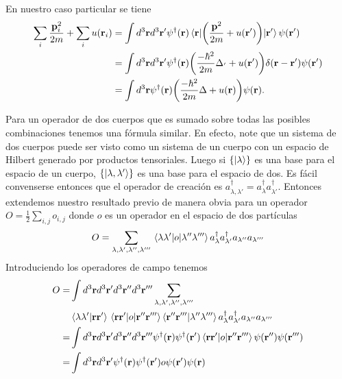 \documentclass{article}
\begin{document}
En nuestro caso particular se tiene
\begin{align}
\begin{split}
\sum_i\frac{\vb{p}_i^2}{2m}+\sum_i u(\vb{r}_i)&=\int d^3\vb{r}d^3\vb{r}'\psi^\dagger(\vb{r})\mel{\vb{r}}{\qty(\frac{\vb{p}^2}{2m}+u(\vb{r}'))}{\vb{r}'}\psi(\vb{r'})\\
&=\int d^3\vb{r}d^3\vb{r}'\psi^\dagger(\vb{r})\qty(\frac{-\hbar^2}{2m}\Delta_{'}+u(\vb{r}'))\delta(\vb{r}-\vb{r}')\psi(\vb{r'})\\
&=\int d^3\vb{r}\psi^\dagger(\vb{r})\qty(\frac{-\hbar^2}{2m}\Delta+u(\vb{r}))\psi(\vb{r}).
\end{split}
\end{align}

Para un operador de dos cuerpos que es sumado sobre todas las posibles combinaciones tenemos una fórmula similar. En efecto, note que un sistema de dos cuerpos puede ser visto como un sistema de un cuerpo con un espacio de Hilbert generado por productos tensoriales. Luego si $\{\ket{\lambda}\}$ es una base para el espacio de un cuerpo, $\{\ket{\lambda,\lambda'}\}$ es una base para el espacio de dos. Es fácil convenserse entonces que el operador de creación es $a_{\lambda,\lambda'}^\dagger=a_\lambda^\dagger a_{\lambda'}^\dagger$. Entonces extendemos nuestro resultado previo de manera obvia para un operador $O=\frac{1}{2}\sum_{i,j}o_{i,j}$ donde $o$ es un operador en el espacio de dos partículas
\begin{equation}
O=\sum_{\lambda,\lambda',\lambda'',\lambda'''}\mel{\lambda\lambda'}{o}{\lambda''\lambda'''}a_{\lambda}^\dagger a_{\lambda'}^\dagger a_{\lambda''}a_{\lambda '''}
\end{equation}
Introduciendo los operadores de campo tenemos
\begin{align}
\begin{split}
O=&\int d^3\vb{r}d^3\vb{r}'d^3\vb{r}''d^3\vb{r}'''\sum_{\lambda,\lambda',\lambda'',\lambda'''}\\
&\ip{\lambda\lambda'}{\vb{r}\vb{r}'}\mel{\vb{r}\vb{r}'}{o}{\vb{r}''\vb{r}'''}\ip{\vb{r}''\vb{r}'''}{\lambda''\lambda'''}a_{\lambda}^\dagger a_{\lambda'}^\dagger a_{\lambda''}a_{\lambda '''}\\
=&\int d^3\vb{r}d^3\vb{r}'d^3\vb{r}''d^3\vb{r}'''\psi^\dagger(\vb{r})\psi^\dagger(\vb{r}')\mel{\vb{r}\vb{r}'}{o}{\vb{r}''\vb{r}'''}\psi(\vb{r}'')\psi(\vb{r}''')\\
=&\int d^3\vb{r}d^3\vb{r}'\psi^\dagger(\vb{r})\psi^\dagger(\vb{r}')o\psi(\vb{r}')\psi(\vb{r})\\
\end{split}
\end{align}
\end{document}
